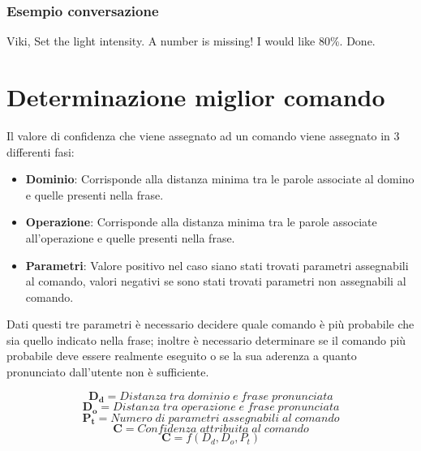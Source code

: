\documentclass[twoside]{supsistudent}
\begin{document}
\subsection{Esempio conversazione}
\begin{dialogue}
 Viki, Set the light intensity.
 A number is missing!
 I would like 80\%.
 Done.
\end{dialogue}



\chapter{Determinazione miglior comando}
Il valore di confidenza che viene assegnato ad un comando viene assegnato in 3 differenti fasi:
\begin{itemize}
  \item \textbf{Dominio}: Corrisponde alla distanza minima tra le parole associate al domino e quelle presenti nella frase.
  \item \textbf{Operazione}: Corrisponde alla distanza minima tra le parole associate all'operazione e quelle presenti nella frase.
  \item \textbf{Parametri}: Valore positivo nel caso siano stati trovati parametri assegnabili al comando, valori negativi se sono stati trovati parametri non assegnabili al comando.
\end{itemize}
Dati questi tre parametri è necessario decidere quale comando è più probabile che sia quello indicato nella frase; inoltre è necessario determinare se il comando più probabile deve essere realmente eseguito o se la sua aderenza a quanto pronunciato dall'utente non è sufficiente.
\begin{center}
\[
\boldsymbol{D_{d}} = Distanza\;tra\;dominio\;e\;frase\;pronunciata
\]
\[
\boldsymbol{D_{o}} = Distanza\;tra\;operazione\;e\;frase\;pronunciata
\]
\[
\boldsymbol{P_{t}} = Numero\;di\;parametri\;assegnabili\;al\;comando
\]
\[
\boldsymbol{C} = Confidenza\;attribuita\;al\;comando
\]
\[
\boldsymbol{C} = f(D_{d} ,D_{o},P_{t})
\]
\end{center}
\newpage
\end{document}

